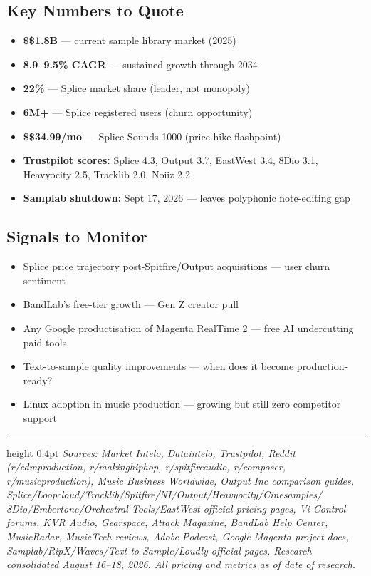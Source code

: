 \documentclass[11pt,a4paper]{article}
\begin{document}
\subsection{Key Numbers to Quote}

\begin{itemize}
  \item \textbf{\$\$1.8B} — current sample library market (2025)
  \item \textbf{8.9--9.5\% CAGR} — sustained growth through 2034
  \item \textbf{22\%} — Splice market share (leader, not monopoly)
  \item \textbf{6M+} — Splice registered users (churn opportunity)
  \item \textbf{\$\$34.99/mo} — Splice Sounds 1000 (price hike flashpoint)
  \item \textbf{Trustpilot scores:} Splice 4.3, Output 3.7, EastWest 3.4, 8Dio 3.1, Heavyocity 2.5, Tracklib 2.0, Noiiz 2.2
  \item \textbf{Samplab shutdown:} Sept 17, 2026 — leaves polyphonic note-editing gap
\end{itemize}

\subsection{Signals to Monitor}

\begin{itemize}
  \item Splice price trajectory post-Spitfire/Output acquisitions — user churn sentiment
  \item BandLab's free-tier growth — Gen Z creator pull
  \item Any Google productisation of Magenta RealTime 2 — free AI undercutting paid tools
  \item Text-to-sample quality improvements — when does it become production-ready?
  \item Linux adoption in music production — growing but still zero competitor support
\end{itemize}


\vspace{10pt}
\hrule height 0.4pt
\vspace{4pt}
{\color{LBGray}\footnotesize\itshape
  Sources: Market Intelo, Dataintelo, Trustpilot, Reddit (r/edmproduction, r/makinghiphop,
  r/spitfireaudio, r/composer, r/musicproduction), Music Business Worldwide, Output Inc
  comparison guides, Splice/Loopcloud/Tracklib/Spitfire/NI/Output/Heavyocity/Cinesamples/
  8Dio/Embertone/Orchestral Tools/EastWest official pricing pages, Vi-Control forums, KVR Audio,
  Gearspace, Attack Magazine, BandLab Help Center, MusicRadar, MusicTech reviews, Adobe Podcast,
  Google Magenta project docs, Samplab/RipX/Waves/Text-to-Sample/Loudly official pages.
  Research consolidated August 16--18, 2026. All pricing and metrics as of date of research.
}
\end{document}

